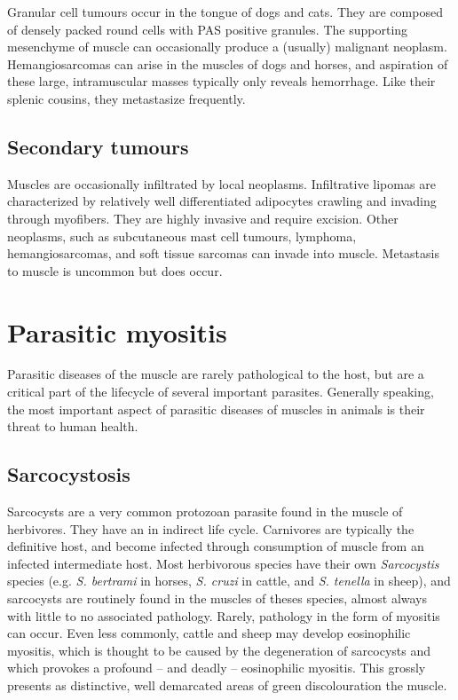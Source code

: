 \documentclass[openany]{book}
\begin{document}
Granular cell tumours occur in the tongue of dogs and cats. They are
composed of densely packed round cells with PAS positive granules. The
supporting mesenchyme of muscle can occasionally produce a (usually)
malignant neoplasm. Hemangiosarcomas can arise in the muscles of dogs
and horses, and aspiration of these large, intramuscular masses
typically only reveals hemorrhage. Like their splenic cousins, they
metastasize frequently.

\section{Secondary tumours}\label{secondary-tumours}

Muscles are occasionally infiltrated by local neoplasms. Infiltrative
lipomas are characterized by relatively well differentiated adipocytes
crawling and invading through myofibers. They are highly invasive and
require excision. Other neoplasms, such as subcutaneous mast cell
tumours, lymphoma, hemangiosarcomas, and soft tissue sarcomas can invade
into muscle. Metastasis to muscle is uncommon but does occur.

\chapter{Parasitic myositis}\label{parasitic-myositis}

Parasitic diseases of the muscle are rarely pathological to the host,
but are a critical part of the lifecycle of several important parasites.
Generally speaking, the most important aspect of parasitic diseases of
muscles in animals is their threat to human health.

\hypertarget{sarcocystosis}{\section{Sarcocystosis}\label{sarcocystosis}}

Sarcocysts are a very common protozoan parasite found in the muscle of
herbivores. They have an in indirect life cycle. Carnivores are
typically the definitive host, and become infected through consumption
of muscle from an infected intermediate host. Most herbivorous species
have their own \emph{Sarcocystis} species (e.g. \emph{S. bertrami} in
horses, \emph{S. cruzi} in cattle, and \emph{S. tenella} in sheep), and
sarcocysts are routinely found in the muscles of theses species, almost
always with little to no associated pathology. Rarely, pathology in the
form of myositis can occur. Even less commonly, cattle and sheep may
develop eosinophilic myositis, which is thought to be caused by the
degeneration of sarcocysts and which provokes a profound -- and deadly
-- eosinophilic myositis. This grossly presents as distinctive, well
demarcated areas of green discolouration the muscle.
\end{document}
